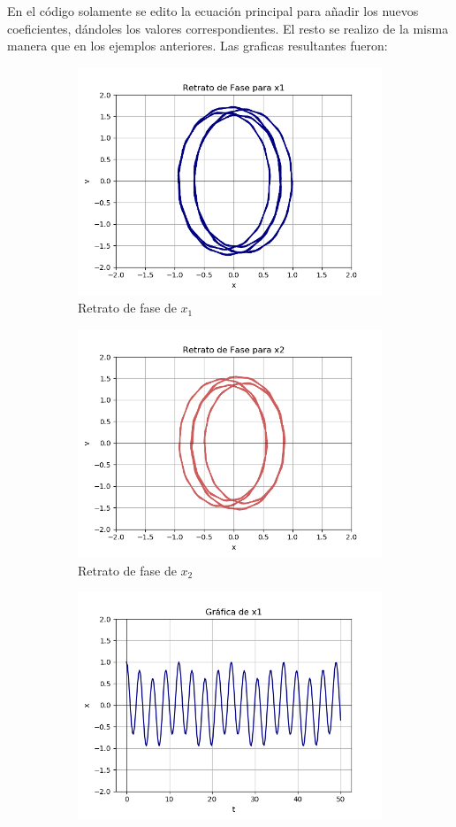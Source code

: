 \documentclass[12pt]{article}
\begin{document}
En el código solamente se edito la ecuación principal para añadir los nuevos coeficientes, dándoles los valores correspondientes. El resto se realizo de la misma manera que en los ejemplos anteriores. Las graficas resultantes fueron:

\begin{figure}[h!]
\begin{subfigure}{.55\textwidth}
  \centering
  \includegraphics[width=.8\linewidth]{Ej3_11.png}
  \caption{Retrato de fase de $x_1$}
  \label{fig:sfig2}
\end{subfigure}
\begin{subfigure}{.55\textwidth}
  \centering
  \includegraphics[width=.8\linewidth]{Ej3_12.png}
  \caption{Retrato de fase de $x_2$}
  \label{fig:sfig2}
\end{subfigure}
\begin{subfigure}{.55\textwidth}
  \centering
  \includegraphics[width=.8\linewidth]{Ej3_13.png}

\end{subfigure}
\end{figure}
\end{document}
